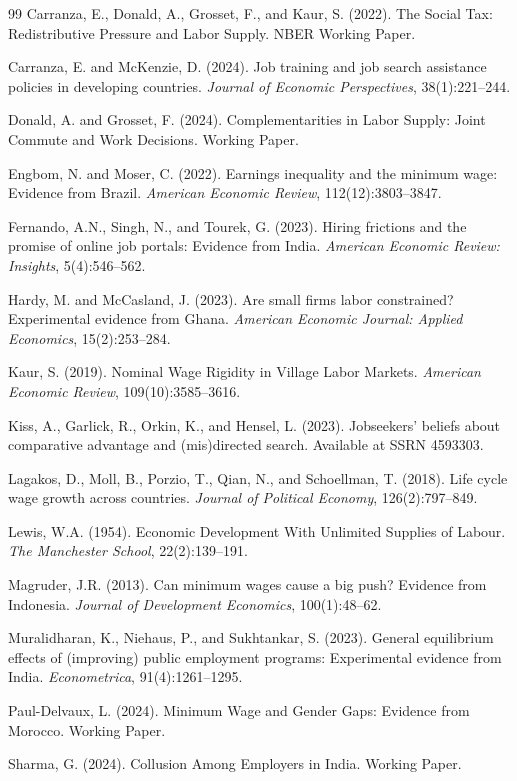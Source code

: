 \documentclass[12pt,a4paper]{article}
\begin{document}
\begin{thebibliography}{99}
Carranza, E., Donald, A., Grosset, F., and Kaur, S. (2022).
The Social Tax: Redistributive Pressure and Labor Supply.
NBER Working Paper.

Carranza, E. and McKenzie, D. (2024).
Job training and job search assistance policies in developing countries.
\textit{Journal of Economic Perspectives}, 38(1):221--244.

Donald, A. and Grosset, F. (2024).
Complementarities in Labor Supply: Joint Commute and Work Decisions.
Working Paper.

Engbom, N. and Moser, C. (2022).
Earnings inequality and the minimum wage: Evidence from Brazil.
\textit{American Economic Review}, 112(12):3803--3847.

Fernando, A.N., Singh, N., and Tourek, G. (2023).
Hiring frictions and the promise of online job portals: Evidence from India.
\textit{American Economic Review: Insights}, 5(4):546--562.

Hardy, M. and McCasland, J. (2023).
Are small firms labor constrained? Experimental evidence from Ghana.
\textit{American Economic Journal: Applied Economics}, 15(2):253--284.

Kaur, S. (2019).
Nominal Wage Rigidity in Village Labor Markets.
\textit{American Economic Review}, 109(10):3585--3616.

Kiss, A., Garlick, R., Orkin, K., and Hensel, L. (2023).
Jobseekers' beliefs about comparative advantage and (mis)directed search.
Available at SSRN 4593303.

Lagakos, D., Moll, B., Porzio, T., Qian, N., and Schoellman, T. (2018).
Life cycle wage growth across countries.
\textit{Journal of Political Economy}, 126(2):797--849.

Lewis, W.A. (1954).
Economic Development With Unlimited Supplies of Labour.
\textit{The Manchester School}, 22(2):139--191.

Magruder, J.R. (2013).
Can minimum wages cause a big push? Evidence from Indonesia.
\textit{Journal of Development Economics}, 100(1):48--62.

Muralidharan, K., Niehaus, P., and Sukhtankar, S. (2023).
General equilibrium effects of (improving) public employment programs: Experimental evidence from India.
\textit{Econometrica}, 91(4):1261--1295.

Paul-Delvaux, L. (2024).
Minimum Wage and Gender Gaps: Evidence from Morocco.
Working Paper.

Sharma, G. (2024).
Collusion Among Employers in India.
Working Paper.

\end{thebibliography}
\end{document}
